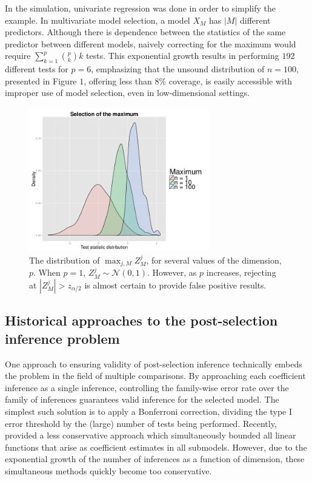 \documentclass{article}
\newcommand{\Nrm}{\mathcal{N}}
\begin{document}
In the simulation, univariate regression was done in order to simplify
the example. In multivariate model selection, a model $X_M$ has
$|M|$ different predictors. Although there is dependence
between the statistics of the same predictor between different models,
naively correcting for the maximum would require
$\sum_{k = 1}^p \binom{p}{k} k$ tests. This exponential growth results in
performing $192$ different tests for $p = 6$, emphasizing that the unsound
distribution of $n = 100$, presented in Figure $1$, offering less than $8\%$
coverage, is easily accessible with improper use of model selection, even in
low-dimensional settings.

\begin{figure}
\begin{center}
\includegraphics[width=0.7\textwidth]{figures/Maxdist}
\end{center}
\caption{The distribution of $\max_{j,M} Z_M^j$, for several values of the
dimension, $p$. When $p = 1$, $Z_M^j \sim \Nrm(0, 1)$. However, as $p$
increases, rejecting at $|Z_M^j| > z_{\alpha/2}$ is almost certain to provide
false positive results.}
\label{fig:sim}
\end{figure}

\subsection{Historical approaches to the post-selection inference problem}
One approach to ensuring validity of post-selection inference technically
embeds the problem in the field of multiple comparisons. By approaching each
coefficient inference as a single inference, controlling the family-wise error
rate over the family of inferences guarantees valid inference for the selected
model. The simplest such solution is to apply a Bonferroni correction,
dividing the type I error threshold by the (large) number of tests being
performed.
Recently, \citet{berk13PoSI} provided a less conservative approach
which simultaneously bounded all linear functions that arise as coefficient 
estimates in all submodels.
However, due to the exponential growth of the number of inferences
as a function of dimension, these simultaneous methods quickly become too
conservative.
\end{document}
